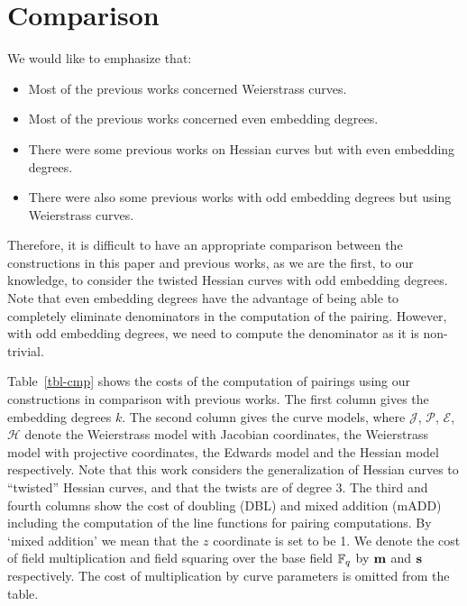 \section{Comparison}
\label{sec:cmp}

We would like to emphasize that:
\begin{itemize}
\item	Most of the previous works concerned Weierstrass curves.
\item	Most of the previous works concerned even embedding degrees.
\item	There were some previous works on Hessian curves but with even embedding degrees.
\item	There were also some previous works with odd embedding degrees but using Weierstrass curves.
\end{itemize}
Therefore, it is difficult to have an appropriate comparison between the constructions in this paper and previous works,
as we are the first, to our knowledge, to consider the twisted Hessian curves with odd embedding degrees.
Note that even embedding degrees have the advantage of being able to completely eliminate denominators in the computation of the pairing.
However, with odd embedding degrees, we need to compute the denominator as it is non-trivial.

Table~\ref{tbl-cmp} shows the costs of the computation of pairings using our constructions in comparison with previous works.
The first column gives the embedding degrees $k$.
The second column gives the curve models, where 
$\mathcal{J}$, $\mathcal{P}$, $\mathcal{E}$, $\mathcal{H}$ denote the
Weierstrass model with Jacobian coordinates, the
Weierstrass model with projective coordinates,
the Edwards model and the
Hessian model respectively.
Note that this work considers the generalization of Hessian curves to ``twisted'' Hessian curves, and that the twists are of degree 3.
The third and fourth columns show the cost of doubling (DBL) and mixed addition (mADD) including the computation of the line functions for pairing computations.
By `mixed addition' we mean that the $z$ coordinate is set to be 1.
We denote the cost of field multiplication and field squaring over the base field $\mathbb{F}_{q}$ by $\textbf{m}$ and $\textbf{s}$ respectively.
The cost of multiplication by curve parameters is omitted from the table.

